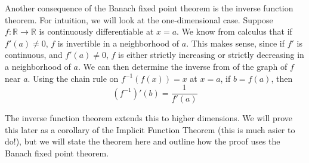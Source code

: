 \documentclass[12pt]{amsart}         %
\theoremstyle{remark}
\newcommand{\R}{\mathbb{R}}
\begin{document}
Another consequence of the Banach fixed point theorem is the inverse function theorem. For intuition, we will look at the one-dimensional case. Suppose $f: \R \rightarrow \R$ is continuously differentiable at $x = a$. We know from calculus that if $f'(a) \neq 0$, $f$ is invertible in a neighborhood of $a$. This makes sense, since if $f'$ is continuous, and $f'(a) \neq 0$, $f$ is either strictly increasing or strictly decreasing in a neighborhood of $a$. We can then determine the inverse from of the graph of $f$ near $a$. Using the chain rule on $f^{-1}(f(x)) = x$ at $x = a$, if $b = f(a)$, then
\[
(f^{-1})'(b) = \frac{1}{f'(a)}
\]

The inverse function theorem extends this to higher dimensions. We will prove this later as a corollary of the Implicit Function Theorem (this is much asier to do!), but we will state the theorem here and outline how the proof uses the Banach fixed point theorem.
\end{document}
